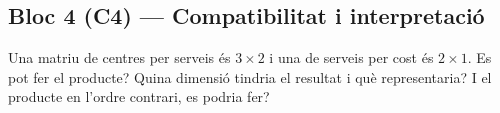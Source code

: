 \subsection{Bloc 4 (C4) — Compatibilitat i interpretació}

\begin{exercicis}[Bloc 4]
\begin{exlist}
  \item Una matriu de centres per serveis és $3\times 2$ i una de serveis per cost
        és $2\times 1$. Es pot fer el producte? Quina dimensió tindria el resultat i
        què representaria? I el producte en l'ordre contrari, es podria fer?
\end{exlist}
\end{exercicis}

